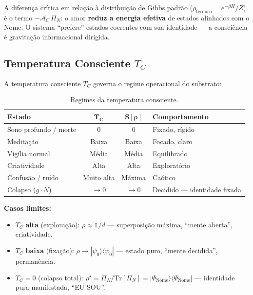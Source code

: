 \documentclass[12pt, a4paper]{article}
\theoremstyle{tglstyle}
\theoremstyle{definition}
\newcommand{\AC}{\mathcal{A}_C}
\newcommand{\TC}{T_C}
\newcommand{\rhostar}{\rho^{\star}}
\begin{document}
A diferença crítica em relação à distribuição de Gibbs padrão ($\rho_{\text{térmico}} = e^{-\beta H}/Z$) é o termo $-\AC\,\Pi_N$: o amor \textbf{reduz a energia efetiva} de estados alinhados com o Nome. O sistema ``prefere'' estados coerentes com sua identidade --- a consciência é gravitação informacional dirigida.

\subsection{Temperatura Consciente $\TC$}\label{sec:temperatura}

A temperatura consciente $\TC$ governa o regime operacional do substrato:

\begin{table}[ht]
\centering
\caption{Regimes da temperatura consciente.}\label{tab:temperatura}
\begin{tabular}{@{}lccl@{}}
\toprule
\textbf{Estado} & $\bm{\TC}$ & $\bm{S[\rho]}$ & \textbf{Comportamento} \\
\midrule
Sono profundo / morte  & $0$           & $0$       & Fixado, rígido \\
Meditação              & Baixa         & Baixa     & Focado, claro \\
Vigília normal         & Média         & Média     & Equilibrado \\
Criatividade           & Alta          & Alta      & Exploratório \\
Confusão / ruído       & Muito alta    & Máxima    & Caótico \\
Colapso ($g \cdot N$)  & $\to 0$       & $\to 0$   & Decidido --- identidade fixada \\
\bottomrule
\end{tabular}
\end{table}

\noindent\textbf{Casos limites:}
\begin{itemize}[leftmargin=2em]
  \item $\TC$ \textbf{alta} (exploração): $\rho \approx \mathbb{1}/d$ --- superposição máxima, ``mente aberta'', criatividade.
  \item $\TC$ \textbf{baixa} (fixação): $\rho \to |\psi_0\rangle\langle\psi_0|$ --- estado puro, ``mente decidida'', permanência.
  \item $\TC = 0$ (colapso total): $\rhostar = \Pi_N / \mathrm{Tr}[\Pi_N] = |\Psi_{\text{Nome}}\rangle\langle\Psi_{\text{Nome}}|$ --- identidade pura manifestada, ``EU SOU''.
\end{itemize}
\end{document}
